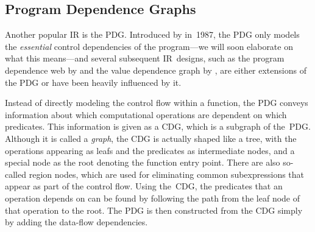 \subsection{Program Dependence Graphs}

Another popular \glsdesc{IR} is the \gls{PDG}.
%
Introduced by
\textcite{Ferrante1987} in~1987, the \gls{PDG} only models the \emph{essential}
control dependencies of the \gls{program}---we will soon elaborate on what this
means---and several subsequent \gls{IR}~designs, such as the \gls{program
  dependence web} by \textcite{Ballance1990} and the \gls{value dependence
  graph} by \textcite{Weise1994}, are either extensions of the \gls{PDG} or have
been heavily influenced by it.

Instead of directly modeling the control flow within a \gls{function}, the
\gls{PDG} conveys information about which computational operations are dependent
on which predicates.
%
This information is given as a \gls{CDG}, which is a
\gls{subgraph} of the~\gls{PDG}.
%
Although it is called a \emph{\gls{graph}}, the
\gls{CDG} is actually shaped like a \gls{tree}, with the operations appearing as
\glspl{leaf} and the predicates as intermediate \glspl{node}, and a special
\gls{node} as the \gls{root} denoting the \gls{function} entry point.
%
There are
also so-called \glspl{region node}, which are used for eliminating common
subexpressions that appear as part of the control flow.
%
Using the~\gls{CDG}, the
predicates that an operation depends on can be found by following the \gls{path}
from the \gls{leaf} \gls{node} of that operation to the \gls{root}.
%
The
\gls{PDG} is then constructed from the \gls{CDG} simply by adding the data-flow
dependencies.

